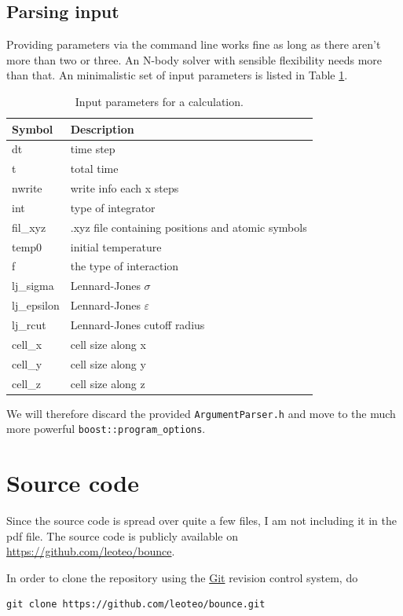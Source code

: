 \documentclass{scrartcl}
\begin{document}
\subsection{Parsing input}

Providing parameters via the command line works fine as long as there aren't
more than two or three.
An N-body solver with sensible flexibility needs more than that.
An minimalistic set of input parameters is listed in Table \ref{tab:input}.

\begin{table}
    \centering
\begin{tabular}[h!]{l|l}
    Symbol & Description \\\hline
    dt & time step \\
    t & total time \\
    nwrite & write info each x steps\\
    int & type of integrator\\
    fil\_xyz & .xyz file containing positions and atomic symbols\\
    temp0 & initial temperature\\ 
    f & the type of interaction\\
    lj\_sigma & Lennard-Jones $\sigma$ \\
    lj\_epsilon & Lennard-Jones $\varepsilon$\\
    lj\_rcut & Lennard-Jones cutoff radius\\
    cell\_x & cell size along x\\
    cell\_y & cell size along y\\
    cell\_z & cell size along z
\end{tabular}
    \caption{Input parameters for a calculation.}
    \label{tab:input}
\end{table}

We will therefore discard the provided \verb|ArgumentParser.h| and move
to the much more powerful \verb|boost::program_options|.

\section{Source code}

Since the source code is spread over quite a few files,
I am not including it in the pdf file.
The source code is publicly available on
\url{https://github.com/leoteo/bounce}.

In order to clone the repository using the \href{http://git-scm.com}{Git} 
revision control system, do

\begin{verbatim}
git clone https://github.com/leoteo/bounce.git
\end{verbatim}
\end{document}

